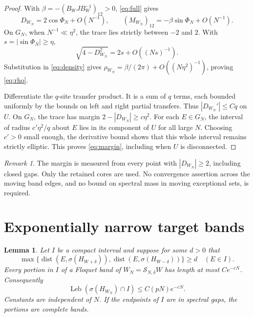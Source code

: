 \documentclass[11pt,a4paper]{article}
\numberwithin{equation}{section}
\newtheorem{lemma}[theorem]{Lemma}
\theoremstyle{remark}
\newtheorem{remark}[theorem]{Remark}
\newcommand{\dist}{\operatorname{dist}}
\newcommand{\spec}{\sigma}
\newcommand{\Leb}{\operatorname{Leb}}
\begin{document}
\begin{proof}
With $\beta=-(B_WJB_W^{-1})_{12}>0$, \eqref{eq:full} gives
\[
D_{W_N}=2\cos\Phi_N+O(N^{-1}),\qquad
(M_{W_N})_{12}=-\beta\sin\Phi_N+O(N^{-1}).
\]
On $G_N$, when $N^{-1}\ll\eta^2$, the trace lies strictly
between $-2$ and $2$. With $s=|\sin\Phi_N|\ge\eta$,
\[
\sqrt{4-D_{W_N}^2}=2s+O((Ns)^{-1}).
\]
Substitution in \eqref{eq:density}
gives $\rho_{W_N}=\beta/(2\pi)+O((N\eta^2)^{-1})$,
proving \eqref{eq:rho}.

Differentiate the $q$-site transfer product. It is a sum of
$q$ terms, each bounded uniformly by the bounds on left and
right partial transfers. Thus $|D_{W_N}'|\le Cq$ on $U$.
On $G_N$, the trace has margin $2-|D_{W_N}|\ge c\eta^2$.
For each $E\in G_N$, the interval of radius $c'\eta^2/q$
about $E$ lies in its component of $U$ for all large $N$.
Choosing $c'>0$ small enough, the derivative bound shows
that this whole interval remains strictly elliptic.
This proves \eqref{eq:margin}, including when $U$ is disconnected.
\end{proof}

\begin{remark}
The margin is measured from every point with $|D_{W_N}|\ge2$,
including closed gaps. Only the retained cores are used.
No convergence assertion across the moving band edges,
and no bound on spectral mass in moving exceptional sets,
is required.
\end{remark}

\section{Exponentially narrow target bands}
\begin{lemma}\label{lem:barrier}
Let $I$ be a compact interval and suppose for some $d>0$ that
\begin{equation}\label{eq:forbidden}
\max\{\dist(E,\spec(H_{W+\delta})),
\dist(E,\spec(H_{W-\delta}))\}\ge d
\quad (E\in I).
\end{equation}
Every portion in $I$ of a Floquet band of
$W_N=\mathcal S_{N,\delta}W$ has length at most $Ce^{-cN}$.
Consequently
\[
\Leb(\spec(H_{W_N})\cap I)\le C(pN)e^{-cN}.
\]
Constants are independent of $N$. If the endpoints of $I$
are in spectral gaps, the portions are complete bands.
\end{lemma}
\end{document}
